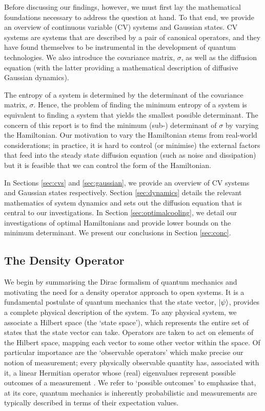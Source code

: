\documentclass[11pt,a4paper]{article}
\numberwithin{equation}{section}
\begin{document}
	Before discussing our findings, however, we must first lay the mathematical foundations necessary to address the question at hand. To that end, we provide an overview of continuous variable (CV) systems and Gaussian states. CV systems are systems that are described by a pair of canonical operators, and they have found themselves to be instrumental in the development of quantum technologies. We also introduce the covariance matrix, $\sigma$, as well as the diffusion equation (with the latter providing a mathematical description of diffusive Gaussian dynamics).
	
	The entropy of a system is determined by the determinant of the covariance matrix, $\sigma$. Hence, the problem of finding the minimum entropy of a system is equivalent to finding a system that yields the smallest possible determinant. The concern of this report is to find the minimum (sub-) determinant of $\sigma$ by varying the Hamiltonian. Our motivation to vary the Hamiltonian stems from real-world considerations; in practice, it is hard to control (or minimise) the external factors that feed into the steady state diffusion equation (such as noise and dissipation) but it is feasible that we can control the form of the Hamiltonian. 
	
	
	In Sections \ref{sec:cvs} and \ref{sec:gaussian}, we provide an overview of CV systems and Gaussian states respectively. Section \ref{sec:dynamics} details the relevant mathematics of system dynamics and sets out the diffusion equation that is central to our investigations. In Section \ref{sec:optimalcooling}, we detail our investigations of optimal Hamiltonians and provide lower bounds on the minimum determinant. We present our conclusions in Section \ref{sec:conc}.
	
	\subsection{The Density Operator}
	\label{sec:densityop}
	We begin by summarising the Dirac formalism of quantum mechanics and motivating the need for a density operator approach to open systems. It is a fundamental postulate of quantum mechanics that the state vector, $\ket{\psi}$, provides a complete physical description of the system.  To any physical system, we associate a Hilbert space (the `state space'), which represents the entire set of states that the state vector can take. Operators are taken to act on elements of the Hilbert space, mapping each vector to some other vector within the space. Of particular importance are the `observable operators' which make precise our notion of measurement; every physically observable quantity has, associated with it, a linear Hermitian operator whose (real) eigenvalues represent possible outcomes of a measurement \cite{vonNeumann55}. We refer to `possible outcomes' to emphasise that, at its core, quantum mechanics is inherently probabilistic and measurements are typically described in terms of their expectation values.
	
\end{document}
